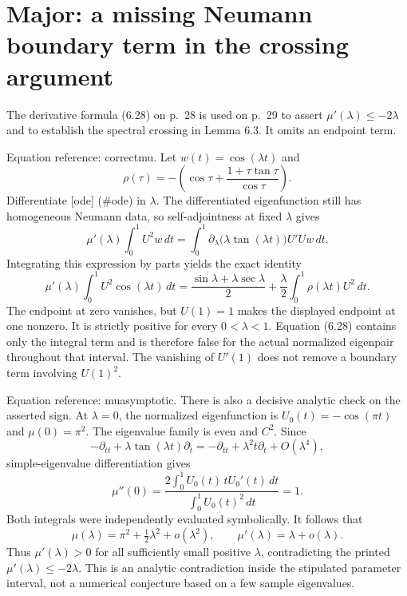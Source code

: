 \documentclass[10pt]{article}
\begin{document}
\section*{Major: a missing Neumann boundary term in the crossing argument}
The derivative formula (6.28) on p. 28 is used on p. 29 to assert \(\mu'(\lambda)\le-2\lambda\) and to establish the spectral crossing in Lemma 6.3. It omits an endpoint term.\par
Equation reference: correctmu. Let \(w(t)=\cos(\lambda t)\) and \[\rho(\tau)=-\left(\cos\tau+\frac{1+\tau\tan\tau}{\cos\tau}\right).\] Differentiate [ode] (\#ode) in \(\lambda\). The differentiated eigenfunction still has homogeneous Neumann data, so self-adjointness at fixed \(\lambda\) gives \[\mu'(\lambda)\int_0^1 U^2w\,dt
 =\int_0^1 \partial_\lambda\!\bigl(\lambda\tan(\lambda t)\bigr)U'U w\,dt.\] Integrating this expression by parts yields the exact identity \[
\mu'(\lambda)\int_0^1 U^2\cos(\lambda t)\,dt
 =\frac{\sin\lambda+\lambda\sec\lambda}{2}
   +\frac{\lambda}{2}\int_0^1\rho(\lambda t)U^2\,dt.\] The endpoint at zero vanishes, but \(U(1)=1\) makes the displayed endpoint at one nonzero. It is strictly positive for every \(0<\lambda<1\). Equation (6.28) contains only the integral term and is therefore false for the actual normalized eigenpair throughout that interval. The vanishing of \(U'(1)\) does not remove a boundary term involving \(U(1)^2\).\par
Equation reference: muasymptotic. There is also a decisive analytic check on the asserted sign. At \(\lambda=0\), the normalized eigenfunction is \(U_0(t)=-\cos(\pi t)\) and \(\mu(0)=\pi^2\). The eigenvalue family is even and \(C^2\). Since \[-\partial_{tt}+\lambda\tan(\lambda t)\partial_t
 =-\partial_{tt}+\lambda^2t\partial_t+O(\lambda^4),\] simple-eigenvalue differentiation gives \[\mu''(0)=
 \frac{2\int_0^1 U_0(t)\,tU_0'(t)\,dt}
      {\int_0^1 U_0(t)^2\,dt}=1.\] Both integrals were independently evaluated symbolically. It follows that \[
\mu(\lambda)=\pi^2+\tfrac12\lambda^2+o(\lambda^2),
\qquad \mu'(\lambda)=\lambda+o(\lambda).\] Thus \(\mu'(\lambda)>0\) for all sufficiently small positive \(\lambda\), contradicting the printed \(\mu'(\lambda)\le-2\lambda\). This is an analytic contradiction inside the stipulated parameter interval, not a numerical conjecture based on a few sample eigenvalues.\par
\end{document}

